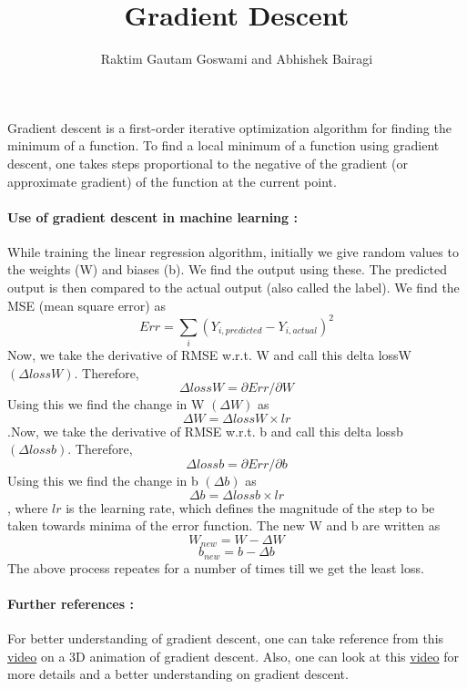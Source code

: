 \documentclass[a4paper,12pt]{article}
\begin{document}
\title{\textbf{Gradient Descent}}
\author{Raktim Gautam Goswami and Abhishek Bairagi}
\maketitle


\paragraph{}
Gradient descent is a first-order iterative optimization algorithm for finding the minimum of a function. To find a local minimum of a function using gradient descent, one takes steps proportional to the negative of the gradient (or approximate gradient) of the function at the current point.

\paragraph*{Use of gradient descent in machine learning :} While training the linear regression algorithm, initially we give random values to the weights (W) and biases (b). We find the output using these. The predicted output is then compared to the actual output (also called the label). We find the MSE (mean square error) as $$Err = \sum_{i}(Y_{i,predicted} - Y_{i,actual})^2$$ Now, we take the derivative of RMSE w.r.t. W and call this delta lossW $(\Delta lossW)$. Therefore, $$\Delta lossW = {\partial Err}/{\partial W} $$ Using this we find the change in W $(\Delta W)$  as $$\Delta W = \Delta lossW \times lr$$ .Now, we take the derivative of RMSE w.r.t. b and call this delta lossb $(\Delta lossb)$. Therefore, $$\Delta lossb = {\partial Err}/{\partial b} $$ Using this we find the change in b $(\Delta b)$  as $$\Delta b = \Delta lossb \times lr$$, where $lr$ is the learning rate, which defines the magnitude of the step to be taken towards minima of the error function. The new W and b are written as $$W_{new} = W - \Delta W$$ $$b_{new} = b - \Delta b$$
\newline The above process repeates for a number of times till we get the least loss.

\paragraph*{Further references : } For better understanding of gradient descent, one can take reference from this \href{https://www.youtube.com/watch?v=GCvWD9zIF-s}{video} on a 3D animation of gradient descent.
\newline Also, one can look at this \href{https://www.youtube.com/watch?v=jc2IthslyzM}{video} for more details and a better understanding on gradient descent.
\end{document}
